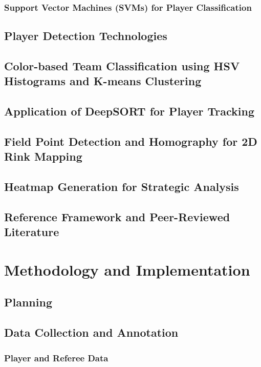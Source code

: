 \documentclass[12pt, letterpaper]{article}
\begin{document}
{\begin{spacing}{1.2}
\subsubsection{Support Vector Machines (SVMs) for Player Classification}

\end{spacing}
}

{
\setlength{\parskip}{0.3cm}
\subsection{Player Detection Technologies}
\begin{spacing}{1.2}
\end{spacing}
}

\subsection{Color-based Team Classification using HSV Histograms and K-means Clustering}
\subsection{Application of DeepSORT for Player Tracking}
\subsection{Field Point Detection and Homography for 2D Rink Mapping}
\subsection{Heatmap Generation for Strategic Analysis}
\subsection{Reference Framework and Peer-Reviewed Literature}
\newpage

\section{Methodology and Implementation}

\subsection{Planning}
\subsection{Data Collection and Annotation}
\subsubsection{Player and Referee Data}
\end{document}

